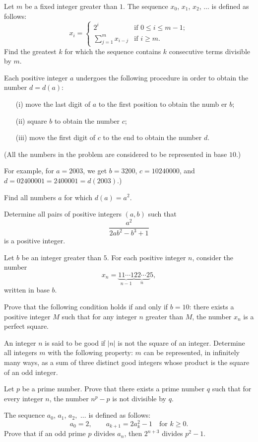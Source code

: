 \item[\textbf{N1.}]Let $m$ be a fixed integer greater than $1$. The sequence $x_0$,  $x_1$,  $x_2$,  $\ldots$ is defined as follows:\[x_i = \begin{cases}2^i&\text{if }0\leq i \leq m - 1;\\\sum_{j=1}^mx_{i-j}&\text{if }i\geq m.\end{cases}\]Find the greatest $k$ for which the sequence contains $k$ consecutive terms divisible by $m$.

\item[\textbf{N2.}]Each positive integer $a$ undergoes the following procedure in order to obtain the number $d = d\left(a\right)$:

\begin{itemize}

\item[(i)] move the last digit of $a$ to the first position to obtain the numb er $b$;

\item[(ii)] square $b$ to obtain the number $c$;

\item[(iii)] move the first digit of $c$ to the end to obtain the number $d$.

\end{itemize}


(All the numbers in the problem are considered to be represented in base $10$.) 

For example, for $a=2003$,  we get $b=3200$,  $c=10240000$,  and $d = 02400001 = 2400001 = d(2003)$.)

Find all numbers $a$ for which $d\left( a\right) =a^2$.

\item[\textbf{N3.}]Determine all pairs of positive integers $(a,b)$ such that  \[ \dfrac{a^2}{2ab^2-b^3+1}  \]  is a positive integer.

\item[\textbf{N4.}]Let $ b$ be an integer greater than $ 5$. For each positive integer $ n$,  consider the number 
\[ x_n = \underbrace{11\cdots1}_{n - 1}\underbrace{22\cdots2}_{n}5, \]
written in base $b$.

Prove that the following condition holds if and only if $ b = 10$: there exists a positive integer $ M$ such that for any integer $ n$ greater than $ M$,   the number $ x_n$ is a perfect square.
\item[\textbf{N5.}]An integer $n$ is said to be good if $|n|$ is not the square of an integer. Determine all integers $m$ with the following property: $m$ can be represented, in infinitely many ways, as a sum of three distinct good integers whose product is the square of an odd integer.
\item[\textbf{N6.}]Let $p$ be a prime number. Prove that there exists a prime number $q$ such that for every integer $n$,  the number $n^p-p$ is not divisible by $q$.
\item[\textbf{N7.}]The sequence $a_0$,  $a_1$,  $a_2,$ $\ldots$ is defined as follows: \[a_0=2, \qquad a_{k+1}=2a_k^2-1 \quad\text{for }k \geq 0.\]Prove that if an odd prime $p$ divides $a_n$,  then $2^{n+3}$ divides $p^2-1$.

